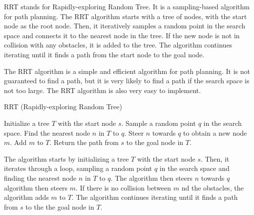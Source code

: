 RRT stands for Rapidly-exploring Random Tree.
It is a sampling-based algorithm for path planning.
The RRT algorithm starts with a tree of nodes, with the start node as the root node.
Then, it iteratively samples a random point in the search space and connects it to the nearest node in the tree.
If the new node is not in collision with any obstacles, it is added to the tree.
The algorithm continues iterating until it finds a path from the start node to the goal node.

The RRT algorithm is a simple and efficient algorithm for path planning.
It is not guaranteed to find a path, but it is very likely to find a path if the search space is not too large.
The RRT algorithm is also very easy to implement.


\begin{algorithm}
    \caption{RRT (Rapidly-exploring Random Tree)}
    \begin{algorithmic}
        \STATE Initialize a tree $T$ with the start node $s$.
        \STATE Sample a random point $q$ in the search space.
        \STATE Find the nearest node $n$ in $T$ to $q$.
        \STATE Steer $n$ towards $q$ to obtain a new node $m$.
        \STATE Add $m$ to $T$.
        \ENDIF
        \ENDFOR
        \STATE Return the path from $s$ to the goal node in $T$.
    \end{algorithmic}
\end{algorithm}

The algorithm starts by initializing a tree $T$ with the start node $s$.
Then, it iterates through a loop, sampling a random point $q$ in the search space and finding the nearest node $n$ in $T$ to $q$.
The algorithm then steers $n$ towards $q$ algorithm then steers $m$.
If there is no collision between $m$ nd the obstacles, the algorithm adds $m$ to $T$.
The algorithm continues iterating until it finds a path from $s$ to the the goal node in $T$.




